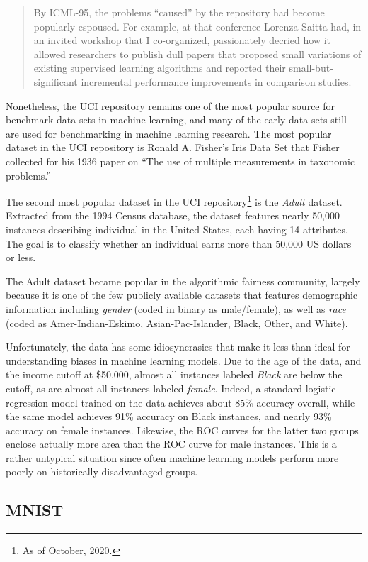 \documentclass{tufte-book}
\begin{document}
\begin{quote}
By ICML-95, the problems ``caused'' by the repository had become
popularly espoused. For example, at that conference Lorenza Saitta had,
in an invited workshop that I co-organized, passionately decried how it
allowed researchers to publish dull papers that proposed small
variations of existing supervised learning algorithms and reported their
small-but-significant incremental performance improvements in comparison
studies.
\end{quote}

Nonetheless, the UCI repository remains one of the most popular source
for benchmark data sets in machine learning, and many of the early data
sets still are used for benchmarking in machine learning research. The
most popular dataset in the UCI repository is Ronald A. Fisher's Iris
Data Set that Fisher collected for his 1936 paper on ``The use of
multiple measurements in taxonomic problems.''

The second most popular dataset in the UCI repository\footnote{As of
  October, 2020.} is the \emph{Adult} dataset. Extracted from the 1994
Census database, the dataset features nearly 50,000 instances describing
individual in the United States, each having 14 attributes. The goal is
to classify whether an individual earns more than 50,000 US dollars or
less.

The Adult dataset became popular in the algorithmic fairness community,
largely because it is one of the few publicly available datasets that
features demographic information including \emph{gender} (coded in
binary as male/female), as well as \emph{race} (coded as
Amer-Indian-Eskimo, Asian-Pac-Islander, Black, Other, and White).

Unfortunately, the data has some idiosyncrasies that make it less than
ideal for understanding biases in machine learning models. Due to the
age of the data, and the income cutoff at \$50,000, almost all instances
labeled \emph{Black} are below the cutoff, as are almost all instances
labeled \emph{female}. Indeed, a standard logistic regression model
trained on the data achieves about 85\% accuracy overall, while the same
model achieves 91\% accuracy on Black instances, and nearly 93\%
accuracy on female instances. Likewise, the ROC curves for the latter
two groups enclose actually more area than the ROC curve for male
instances. This is a rather untypical situation since often machine
learning models perform more poorly on historically disadvantaged
groups.

\hypertarget{mnist}{%
\subsection{MNIST}\label{mnist}}
\end{document}
